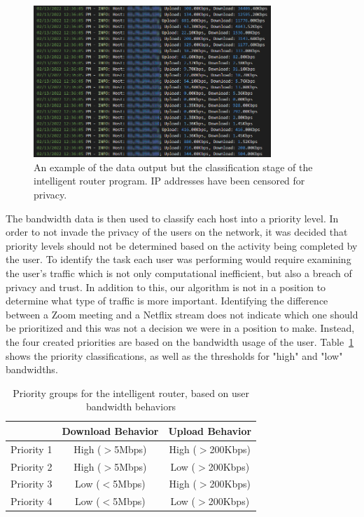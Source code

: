 \begin{figure}[!ht]
    \centering
    \includegraphics[width=0.8\textwidth,keepaspectratio]{Images/Chpt4/LogFile.png}
    \caption{An example of the data output but the classification stage of the intelligent router program. IP addresses have been censored for privacy.}
    \label{log_file}
\end{figure}
The bandwidth data is then used to classify each host into a priority level.
In order to not invade the privacy of the users on the network, it was decided that priority levels should not be determined based on the activity being completed by the user.
To identify the task each user was performing would require examining the user's traffic which is not only computational inefficient, but also a breach of privacy and trust.
In addition to this, our algorithm is not in a position to determine what type of traffic is more important.
Identifying the difference between a Zoom meeting and a Netflix stream does not indicate which one should be prioritized and this was not a decision we were in a position to make.
Instead, the four created priorities are based on the bandwidth usage of the user.
Table~\ref{priority_table} shows the priority classifications, as well as the thresholds for "high" and "low" bandwidths.\par
\begin{table}[!ht]
\centering
\caption{Priority groups for the intelligent router, based on user bandwidth behaviors}
\begin{adjustbox}{width=0.8\textwidth, center=\textwidth}
    \begin{tabular}{r|cc}
    \multicolumn{1}{c|}{} & Download Behavior & \multicolumn{1}{l}{Upload Behavior} \\ 
    \hline
    Priority 1 & High ($>$5Mbps) & High ($>$200Kbps) \\
    Priority 2 & High ($>$5Mbps) & Low ($>$200Kbps)\\
    Priority 3 & Low ($<$5Mbps) & High ($>$200Kbps)\\
    Priority 4 & Low ($<$5Mbps) & Low ($>$200Kbps)
    \end{tabular}
\end{adjustbox}
\label{priority_table}
\end{table}
